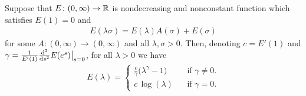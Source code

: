 \begin{lemma}
  \label{lem:solve-E}
   \leanok
  Suppose that $E \colon (0,\infty) \to \mathbb{R}$
  is nondecreasing and nonconstant function which satisfies $E(1) = 0$ and
  \begin{align*}
  E(\lambda \sigma) = E(\lambda) A(\sigma) + E(\sigma)
  \end{align*}
  for some $A \colon (0,\infty) \to (0,\infty)$ and all $\lambda, \sigma > 0$.
  Then, denoting $c = E'(1)$ and $\gamma = \frac{1}{E'(1)} \frac{\mathrm{d}^2}{\mathrm{d} {s}^2} E(e^s) \big|_{s=0}$,
  for all $\lambda > 0$ we have
  \begin{align*}
  E(\lambda) = \begin{cases}
    \frac{c}{\gamma} \big( \lambda^\gamma - 1 \big) & \;\;\text{ if $\gamma \ne 0$.} \\
    c \, \log (\lambda) & \;\;\text{ if $\gamma = 0$.}
    \end{cases}
  \end{align*}
\end{lemma}
